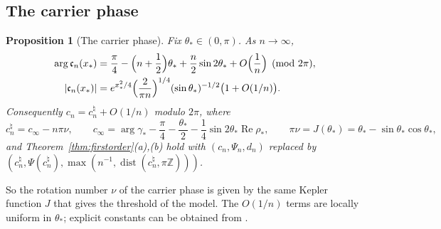 \documentclass[11pt]{amsart}
\newtheorem{proposition}[theorem]{Proposition}
\theoremstyle{definition}
\theoremstyle{remark}
\numberwithin{equation}{section}
\newcommand{\Z}{\mathbb{Z}}
\DeclareMathOperator{\re}{Re}
\DeclareMathOperator{\dist}{dist}
\begin{document}
\subsection{The carrier phase}\label{sec:phase}

\begin{proposition}[The carrier phase]\label{prop:phase}
Fix $\theta_*\in(0,\pi)$. As $n\to\infty$,
\begin{align*}
\arg\mathfrak c_n(x_*)&=\frac\pi4-\Bigl(n+\frac12\Bigr)\theta_*+\frac n2\sin2\theta_*+O\Bigl(\frac1n\Bigr)\pmod{2\pi},\\
|\mathfrak c_n(x_*)|&=e^{x_*^2/4}\Bigl(\frac2{\pi n}\Bigr)^{1/4}(\sin\theta_*)^{-1/2}\bigl(1+O(1/n)\bigr).
\end{align*}
Consequently $c_n=c_n^\natural+O(1/n)$ modulo $2\pi$, where
\[
c_n^\natural=c_\infty-n\pi\nu,\qquad c_\infty=\arg\gamma_*-\frac\pi4-\frac{\theta_*}2-\frac14\sin2\theta_*\re\rho_*,\qquad
\pi\nu=J(\theta_*)=\theta_*-\sin\theta_*\cos\theta_*,
\]
and Theorem~\ref{thm:firstorder}(a),(b) hold with $(c_n,\Psi_n,d_n)$ replaced by
$(c_n^\natural,\Psi(c_n^\natural),\max(n^{-1},\dist(c_n^\natural,\pi\Z)))$.
\end{proposition}

So the rotation number $\nu$ of the carrier phase is given by the same Kepler function $J$ that gives the threshold of the
model. The $O(1/n)$ terms are locally uniform in $\theta_*$; explicit constants can be obtained from \cite[Theorem~3.1]{SNWW}.
\end{document}
